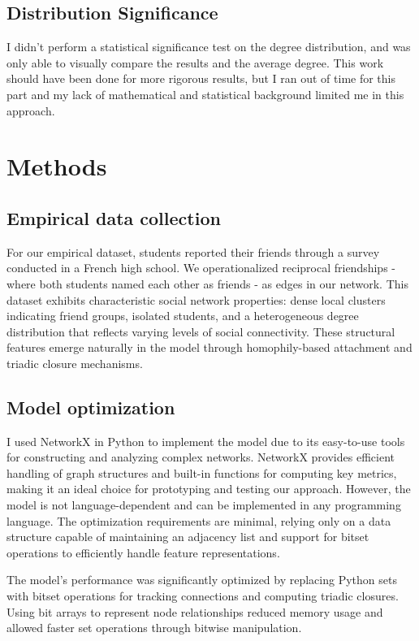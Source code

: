 \documentclass[runningheads]{llncs}
\begin{document}
\subsection{Distribution Significance}
I didn't perform a statistical significance test on the degree distribution, and was only able to visually compare the results and the average degree. This work should have been done for more rigorous results, but I ran out of time for this part and my lack of mathematical and statistical background limited me in this approach.

\section{Methods}
\subsection{Empirical data collection}
For our empirical dataset, students reported their friends through a survey conducted in a French high school. We operationalized reciprocal friendships - where both students named each other as friends - as edges in our network. This dataset exhibits characteristic social network properties: dense local clusters indicating friend groups, isolated students, and a heterogeneous degree distribution that reflects varying levels of social connectivity. These structural features emerge naturally in the model through homophily-based attachment and triadic closure mechanisms.

\subsection{Model optimization}
I used NetworkX \cite{SciPyProceedings_11} in Python to implement the model due to its easy-to-use tools for constructing and analyzing complex networks. NetworkX provides efficient handling of graph structures and built-in functions for computing key metrics, making it an ideal choice for prototyping and testing our approach. However, the model is not language-dependent and can be implemented in any programming language. The optimization requirements are minimal, relying only on a data structure capable of maintaining an adjacency list and support for bitset operations to efficiently handle feature representations.

The model's performance was significantly optimized by replacing Python sets with bitset operations for tracking connections and computing triadic closures. Using bit arrays to represent node relationships reduced memory usage and allowed faster set operations through bitwise manipulation.
\end{document}
